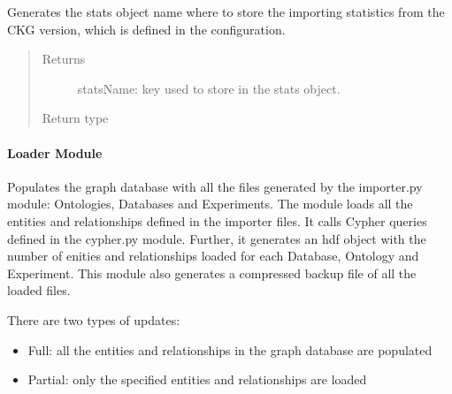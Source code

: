 \documentclass[letterpaper,10pt,english]{sphinxmanual}
\begin{document}

\begin{fulllineitems}
\label{\detokenize{_autosummary/graphdb_builder.builder:graphdb_builder.builder.importer.getStatsName}}
Generates the stats object name where to store the importing statistics from the CKG version,     which is defined in the configuration.
\begin{quote}\begin{description}
\item[{Returns}] \leavevmode
statsName: key used to store in the stats object.

\item[{Return type}] \leavevmode
{}

\end{description}\end{quote}

\end{fulllineitems}



\paragraph{Loader Module}
\label{\detokenize{_autosummary/graphdb_builder.builder:module-graphdb_builder.builder.loader}}\label{\detokenize{_autosummary/graphdb_builder.builder:loader-module}}
Populates the graph database with all the files generated by the importer.py module: 
Ontologies, Databases and Experiments.
The module loads all the entities and relationships defined in the importer files. It
calls Cypher queries defined in the cypher.py module. Further, it generates an hdf object
with the number of enities and relationships loaded for each Database, Ontology and Experiment.
This module also generates a compressed backup file of all the loaded files.

There are two types of updates:
\begin{itemize}
\item {} 
Full: all the entities and relationships in the graph database are populated

\item {} 
Partial: only the specified entities and relationships are loaded

\end{itemize}
\end{document}
